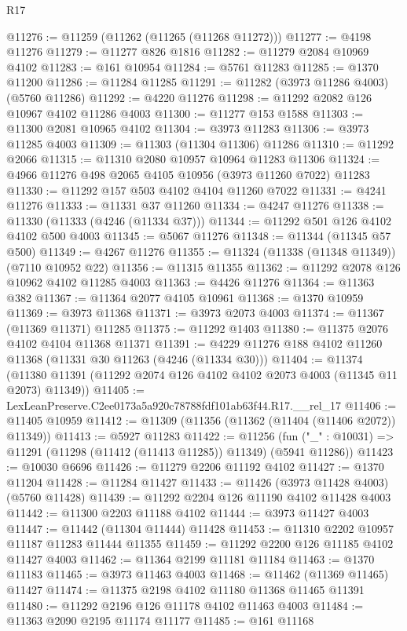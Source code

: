 \begin{lexlean}{R17}
\begin{coremodule}
@11276 := @11259 (@11262 (@11265 (@11268 @11272)))
@11277 := @4198 @11276
@11279 := @11277 @826 @1816
@11282 := @11279 @2084 @10969 @4102
@11283 := @161 @10954
@11284 := @5761 @11283
@11285 := @1370 @11200
@11286 := @11284 @11285
@11291 := @11282 (@3973 @11286 @4003) (@5760 @11286)
@11292 := @4220 @11276
@11298 := @11292 @2082 @126 @10967 @4102 @11286 @4003
@11300 := @11277 @153 @1588
@11303 := @11300 @2081 @10965 @4102
@11304 := @3973 @11283
@11306 := @3973 @11285 @4003
@11309 := @11303 (@11304 @11306) @11286
@11310 := @11292 @2066
@11315 := @11310 @2080 @10957 @10964 @11283 @11306
@11324 := @4966 @11276 @498 @2065 @4105 @10956 (@3973 @11260 @7022) @11283
@11330 := @11292 @157 @503 @4102 @4104 @11260 @7022
@11331 := @4241 @11276
@11333 := @11331 @37 @11260
@11334 := @4247 @11276
@11338 := @11330 (@11333 (@4246 (@11334 @37)))
@11344 := @11292 @501 @126 @4102 @4102 @500 @4003
@11345 := @5067 @11276
@11348 := @11344 (@11345 @57 @500)
@11349 := @4267 @11276
@11355 := @11324 (@11338 (@11348 @11349)) (@7110 @10952 @22)
@11356 := @11315 @11355
@11362 := @11292 @2078 @126 @10962 @4102 @11285 @4003
@11363 := @4426 @11276
@11364 := @11363 @382
@11367 := @11364 @2077 @4105 @10961
@11368 := @1370 @10959
@11369 := @3973 @11368
@11371 := @3973 @2073 @4003
@11374 := @11367 (@11369 @11371) @11285
@11375 := @11292 @1403
@11380 := @11375 @2076 @4102 @4104 @11368 @11371
@11391 := @4229 @11276 @188 @4102 @11260 @11368 (@11331 @30 @11263 (@4246 (@11334 @30)))
@11404 := @11374
    (@11380 @11391 (@11292 @2074 @126 @4102 @4102 @2073 @4003 (@11345 @11 @2073) @11349))
@11405 := LexLeanPreserve.C2ee0173a5a920c78788fdf101ab63f44.R17.__rel_17
@11406 := @11405 @10959
@11412 := @11309 (@11356 (@11362 (@11404 (@11406 @2072)) @11349))
@11413 := @5927 @11283
@11422 := @11256
    (fun ("_" : @10031) => @11291 (@11298 (@11412 (@11413 @11285)) @11349) (@5941 @11286))
@11423 := @10030 @6696
@11426 := @11279 @2206 @11192 @4102
@11427 := @1370 @11204
@11428 := @11284 @11427
@11433 := @11426 (@3973 @11428 @4003) (@5760 @11428)
@11439 := @11292 @2204 @126 @11190 @4102 @11428 @4003
@11442 := @11300 @2203 @11188 @4102
@11444 := @3973 @11427 @4003
@11447 := @11442 (@11304 @11444) @11428
@11453 := @11310 @2202 @10957 @11187 @11283 @11444 @11355
@11459 := @11292 @2200 @126 @11185 @4102 @11427 @4003
@11462 := @11364 @2199 @11181 @11184
@11463 := @1370 @11183
@11465 := @3973 @11463 @4003
@11468 := @11462 (@11369 @11465) @11427
@11474 := @11375 @2198 @4102 @11180 @11368 @11465 @11391
@11480 := @11292 @2196 @126 @11178 @4102 @11463 @4003
@11484 := @11363 @2090 @2195 @11174 @11177
@11485 := @161 @11168

\end{coremodule}
\end{lexlean}
